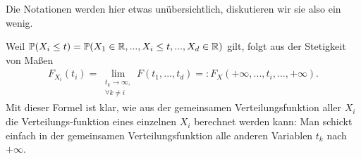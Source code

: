 Die Notationen werden hier etwas un\"ubersichtlich, diskutieren wir sie also ein wenig. 
\begin{bem}\label{bem33}
Weil $\mathbb P(X_i\leq t)=\mathbb P(X_1\in \mathbb{R}, ..., X_i\leq t, ..., X_d\in \mathbb{R})$ gilt, folgt aus der Stetigkeit von Ma\ss en
\begin{align*}
	F_{X_i}(t_i) =\lim\limits_{\substack{t_k \to \infty,\\ \forall k\neq i}} F(t_1,...,t_d)=: F_X(+\infty,..., t_i, ...,+\infty).
\end{align*}
Mit dieser Formel ist klar, wie aus der gemeinsamen Verteilungsfunktion aller $X_i$ die Verteilungs-funktion eines einzelnen $X_i$ berechnet werden kann: Man schickt einfach in der gemeinsamen Verteilungsfunktion alle anderen Variablen $t_k$ nach $+\infty$.
\end{bem}

